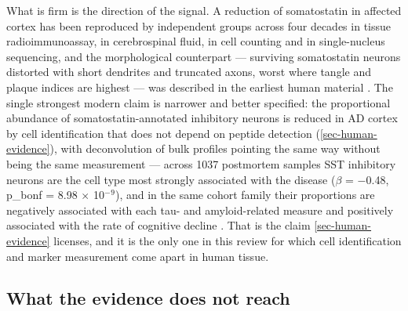 \documentclass[11pt]{article}
\begin{document}
What is firm is the direction of the signal. A reduction of somatostatin in affected cortex has been reproduced by independent groups across four decades in tissue radioimmunoassay, in cerebrospinal fluid, in cell counting and in single-nucleus sequencing, and the morphological counterpart --- surviving somatostatin neurons distorted with short dendrites and truncated axons, worst where tangle and plaque indices are highest --- was described in the earliest human material \citep{ChanPalay1987}. The single strongest modern claim is narrower and better specified: the proportional abundance of somatostatin-annotated inhibitory neurons is reduced in AD cortex by cell identification that does not depend on peptide detection (\ref{sec-human-evidence}), with deconvolution of bulk profiles pointing the same way without being the same measurement --- across 1037 postmortem samples SST inhibitory neurons are the cell type most strongly associated with the disease ($\beta$ = $-$0.48, p\_bonf = 8.98 $\times$ 10$^{-}$$^{9}$), and in the same cohort family their proportions are negatively associated with each tau- and amyloid-related measure and positively associated with the rate of cognitive decline \citep{Consens2022b}. That is the claim \ref{sec-human-evidence} licenses, and it is the only one in this review for which cell identification and marker measurement come apart in human tissue.

\subsection{What the evidence does not reach}
\label{sec-12-what-does-not-hold}
\end{document}
